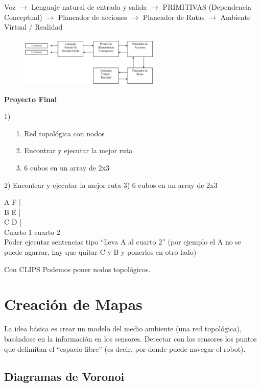 Voz $\rightarrow$ Lenguaje natural de entrada y salida $\rightarrow$ PRIMITIVAS (Dependencia Conceptual) $\rightarrow$ Planeador de
acciones $\rightarrow$ Planeador de Rutas $\rightarrow$ Ambiente Virtual / Realidad

\begin{figure}[h!]
	\centering
	\includegraphics[width=0.6\textwidth]{images/img99.png}
	\label{figura99}
\end{figure}



\textbf{Proyecto Final}

1) \begin{enumerate}
	\item [1.] Red topológica con nodos
	\item [2.] Encontrar y ejecutar la mejor ruta
	\item [3.] 6 cubos en un array de 2x3
	
\end{enumerate}

2) Encontrar y ejecutar la mejor ruta
3) 6 cubos en un array de 2x3

A F | \\
B E | \\
C D | \\
Cuarto 1  cuarto 2 
\\

Poder ejecutar sentencias tipo “lleva A al cuarto 2”
(por ejemplo el A no se puede agarrar, hay que quitar C y B y ponerlos en otro lado)

Con CLIPS
Podemos poner nodos topológicos.


\section{Creación de Mapas}

La idea básica es crear un modelo del medio ambiente (una red topológica), basándose en la información en
los sensores.
Detectar con los sensores los puntos que delimitan el “espacio libre” (es decir, por donde puede navegar el
robot).

\subsection{Diagramas de Voronoi}

